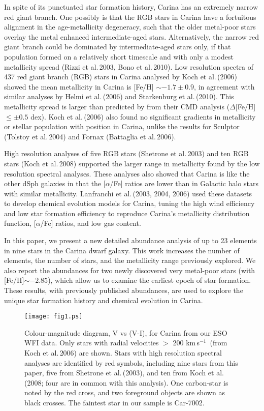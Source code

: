 \documentclass{emulateapj}
\newcommand\kms{km\,s$^{-1}$}
\newcommand\etal{{\rm et al.\,}}
\begin{document}
In spite of its punctuated star formation history, Carina has 
an extremely narrow red giant branch.   One possibly is that the
RGB stars in Carina have a fortuitous alignment in the age-metallicity 
degeneracy, such that the older metal-poor stars overlay the 
metal enhanced intermediate-aged stars. 
Alternatively, the narrow red giant branch could be dominated by
intermediate-aged stars only, if that population formed on a 
relatively short timescale and with only a modest metallicity spread
(Rizzi \etal 2003, Bono \etal 2010).
%
Low resolution spectra of 437 red giant branch (RGB) stars in Carina 
analysed by Koch \etal (2006) showed the mean metallicity in Carina is
[Fe/H] $\sim -1.7 \pm0.9$, in agreement with similar analyses
by Helmi \etal (2006) and Starkenburg \etal (2010).  This metallicity
spread is larger than predicted by \citet{Bon10} from their CMD
analysis ($\Delta$[Fe/H] $\le \pm0.5$ dex). 
%
Koch \etal (2006) also found no significant gradients in metallicity or
stellar population with position in Carina, unlike the results for
Sculptor (Tolstoy \etal 2004) and Fornax (Battaglia \etal 2006).

High resolution analyses of five RGB stars (Shetrone \etal  2003) 
and ten RGB stars (Koch \etal  2008) supported the larger range in
metallicity found by the low resolution spectral analyses.   These
analyses also showed that Carina is like the other dSph galaxies in 
that the [$\alpha$/Fe] ratios are lower than in Galactic halo stars
with similar metallicity.   Lanfranchi \etal (2003, 2004, 2006) used 
these datasets to develop chemical evolution models for Carina, tuning 
the high wind efficiency and low star formation efficiency to reproduce 
Carina's metallicity distribution function, [$\alpha$/Fe] ratios, 
and low gas content.   

In this paper, we present a new detailed abundance analysis of up to
23 elements in nine stars in the Carina dwarf galaxy.    This work
increases the number of elements, the number of stars, and the 
metallicity range previously explored.   We also report the abundances
for two newly discovered very metal-poor stars (with [Fe/H]$\sim -2.85$),
which allow us to examine the earliest epoch of star formation.
These results, with previously published abundances, are used to
explore the unique star formation history and chemical evolution in Carina.


\begin{figure}[t]
\texttt{[image: fig1.ps]}
\caption{Colour-magnitude diagram, V vs (V-I), for Carina
from our ESO WFI data.   Only stars with radial velocities 
$>$ 200 \kms\ (from Koch \etal 2006) are shown.
Stars with high resolution spectral analyses are identified
by red symbols, including nine stars from this paper, five
from Shetrone \etal (2003), and ten from Koch \etal (2008; 
four are in common with this analysis). 
One carbon-star is noted by the red cross,
and two foreground objects are shown as black crosses.
The faintest star in our sample is Car-7002. \\
}
\label{cmd}
\end{figure}
\end{document}

